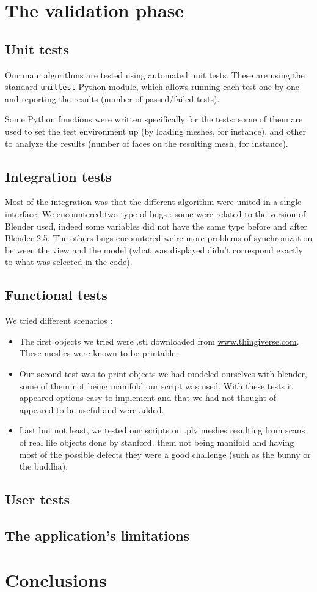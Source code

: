 \documentclass{report}
\begin{document}
\chapter{The validation phase}

\section{Unit tests}
Our main algorithms are tested using automated unit tests. These are using the standard \texttt{unittest} Python module, which allows running each test one by one and reporting the results (number of passed/failed tests).

Some Python functions were written specifically for the tests: some of them are used to set the test environment up (by loading meshes, for instance), and other to analyze the results (number of faces on the resulting mesh, for instance).

\section{Integration tests}
Most of the integration was that the different algorithm were united in a single interface. We encountered two type of bugs : some were related to the version of Blender used, indeed some variables did not have the same type before and after Blender 2.5. The others bugs encountered we're more problems of synchronization between the view and the model (what was displayed didn't correspond exactly to what was selected in the code). 
\section{Functional tests}

We tried different scenarios :
\begin{itemize}
\item The first objects we tried were .stl downloaded from \url{www.thingiverse.com}. These meshes were known to be printable.
\item Our second test was to print objects we had modeled ourselves with blender, some of them not being manifold our script was used. With these tests it appeared options easy to implement and that we had not thought of appeared to be useful and were added.
\item Last but not least, we tested our scripts on .ply meshes resulting from scans of real life objects done by stanford. them not being manifold and having most of the possible defects they were a good challenge (such as the bunny or the buddha).  
\end{itemize}

\section{User tests}

\section{The application's limitations}

\chapter{Conclusions}





\appendix
\end{document}
